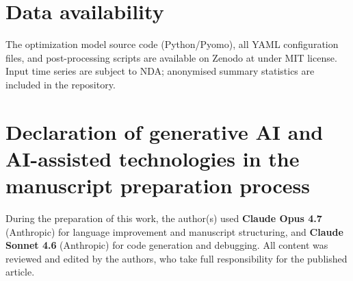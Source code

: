 \documentclass[a4paper,fleqn]{cas-dc}
\begin{document}
\section*{Data availability}

The optimization model source code (Python/Pyomo), all YAML
configuration files, and post-processing scripts are available on
Zenodo at \cite{ruess_2026_calion} under MIT
license. Input time series are subject to NDA; anonymised summary
statistics are included in the repository.

\section*{Declaration of generative AI and AI-assisted technologies in the manuscript preparation process}

During the preparation of this work, the author(s) used
\textbf{Claude Opus 4.7} (Anthropic) for language improvement and
manuscript structuring, and \textbf{Claude Sonnet 4.6} (Anthropic)
for code generation and debugging. All content was reviewed and
edited by the authors, who take full responsibility for the
published article.

\end{document}
